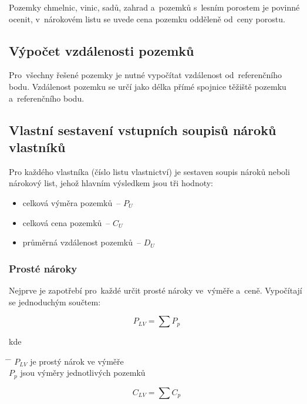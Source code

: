 Pozemky chmelnic, vinic, sadů, zahrad a~pozemků s~lesním porostem je
povinné ocenit, v~nárokovém listu se uvede cena pozemku odděleně
od~ceny porostu.

\subsection{Výpočet vzdálenosti pozemků}
\label{vypocet_vzdalnosti_pozemku}

Pro~všechny řešené pozemky je nutné vypočítat vzdálenost
od~referenčního bodu. Vzdálenost pozemku se určí jako délka přímé
spojnice těžiště pozemku a~referenčního bodu.

\subsection{Vlastní sestavení vstupních soupisů nároků vlastníků}
\label{vlastni_naroky}

Pro každého vlastníka (číslo listu vlastnictví) je sestaven soupis
nároků neboli náro\-kový list, jehož hlavním výsledkem jsou tři
hodnoty: \vspace{-\topsep}
	\begin{itemize}[leftmargin=1.5cm, noitemsep]
		\item celková výměra pozemků~– $P_{U}$
		\item celková cena pozemků~– $C_{U}$
		\item průměrná vzdálenost pozemků~– $D_{U}$
	\end{itemize}

\subsubsection{Prosté nároky}
\label{proste_naroky}

Nejprve je zapotřebí pro~každé  určit prosté nároky ve~výměře
a~ceně. Vypočítají se jednoduchým součtem:

\begin{equation} P_{LV} = \sum\nolimits P_{p}
\end{equation}

kde
\begin{tabbing} \hspace{2em} \= \hspace{5em} \= \kill \> $P_{LV}$ \>
je prostý nárok ve výměře \\ \> $P_{p}$ \> jsou výměry jednotlivých
pozemků
\end{tabbing}

\begin{equation} C_{LV} = \sum\nolimits C_{p}
\end{equation}

